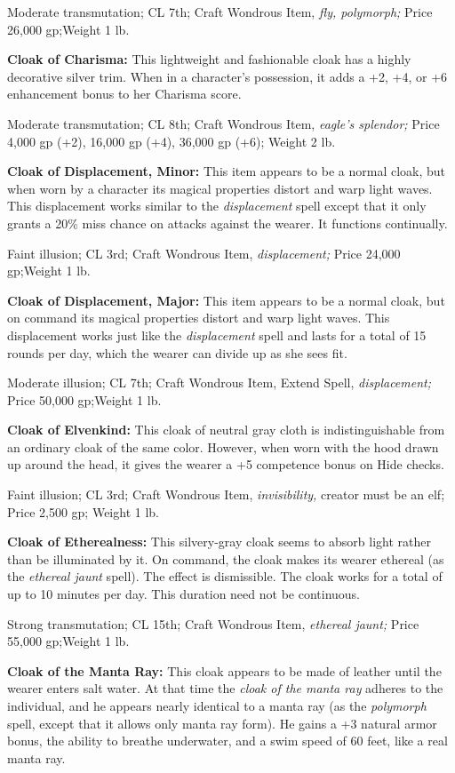 Moderate transmutation; CL 7th; Craft Wondrous Item, \textit{fly, polymorph; }Price 
26,000 gp;Weight 1 lb.

\textbf{Cloak of Charisma: }This lightweight and fashionable cloak has a highly 
decorative silver trim. When in a character's possession, it adds a +2, +4, or 
+6 enhancement bonus to her Charisma score.

Moderate transmutation; CL 8th; Craft Wondrous Item, \textit{eagle's splendor; 
}Price 4,000 gp (+2), 16,000 gp (+4), 36,000 gp (+6); Weight 2 lb.

\textbf{Cloak of Displacement, Minor:} This item appears to be a normal cloak, 
but when worn by a character its magical properties distort and warp light waves. 
This displacement works similar to the \textit{displacement }spell except that 
it only grants a 20\% miss chance on attacks against the wearer. It functions continually.

Faint illusion; CL 3rd; Craft Wondrous Item, \textit{displacement; }Price 24,000 
gp;Weight 1 lb.

\textbf{Cloak of Displacement, Major:} This item appears to be a normal cloak, 
but on command its magical properties distort and warp light waves. This displacement 
works just like the \textit{displacement }spell and lasts for a total of 15 rounds 
per day, which the wearer can divide up as she sees fit.

Moderate illusion; CL 7th; Craft Wondrous Item, Extend Spell, \textit{displacement; 
}Price 50,000 gp;Weight 1 lb.

\textbf{Cloak of Elvenkind:} This cloak of neutral gray cloth is indistinguishable 
from an ordinary cloak of the same color. However, when worn with the hood drawn 
up around the head, it gives the wearer a +5 competence bonus on Hide checks.

Faint illusion; CL 3rd; Craft Wondrous Item, \textit{invisibility, }creator must 
be an elf; Price 2,500 gp; Weight 1 lb.

\textbf{Cloak of Etherealness:} This silvery-gray cloak seems to absorb light rather 
than be illuminated by it. On command, the cloak makes its wearer ethereal (as 
the \textit{ethereal jaunt }spell). The effect is dismissible. The cloak works 
for a total of up to 10 minutes per day. This duration need not be continuous.

Strong transmutation; CL 15th; Craft Wondrous Item, \textit{ethereal jaunt; }Price 
55,000 gp;Weight 1 lb.

\textbf{Cloak of the Manta Ray:} This cloak appears to be made of leather until 
the wearer enters salt water. At that time the \textit{cloak of the manta ray }adheres 
to the individual, and he appears nearly identical to a manta ray (as the \textit{polymorph 
}spell, except that it allows only manta ray form). He gains a +3 natural armor 
bonus, the ability to breathe underwater, and a swim speed of 60 feet, like a real 
manta ray.

